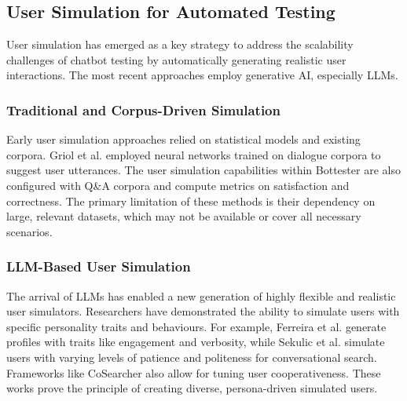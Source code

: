 \subsection{User Simulation for Automated Testing}

User simulation has emerged as a key strategy to
address the scalability challenges of chatbot testing
by automatically generating realistic user interactions.
The most recent approaches employ generative \acl{AI},
especially \acp {LLM}.

\subsubsection{Traditional and Corpus-Driven Simulation}

Early user simulation approaches
relied on statistical models and existing corpora.
Griol et al. \autocite{griolAutomaticDialogSimulation2013}
employed neural networks trained on dialogue corpora
to suggest user utterances.
The user simulation capabilities within Bottester
\autocite{vasconcelosBottesterTestingConversational2017}
are also configured with Q\&A corpora
and compute metrics on satisfaction and correctness.
The primary limitation of these methods is
their dependency on large, relevant datasets,
which may not be available or cover all necessary scenarios.

\subsubsection{LLM-Based User Simulation}

The arrival of \acp{LLM} has enabled a new generation
of highly flexible and realistic user simulators.
Researchers have demonstrated the ability
to simulate users with specific personality traits and behaviours.
For example, Ferreira et al. \autocite{ferreiraMultitraitUserSimulation2024}
generate profiles with traits like engagement and verbosity,
while Sekulic et al. \autocite{sekulicSimulatingConversationalSearch2024}
simulate users with varying levels of patience and politeness for conversational search.
Frameworks like CoSearcher \autocite{salleStudyingEffectivenessConversational2021}
also allow for tuning user cooperativeness.
These works prove the principle of creating diverse, persona-driven simulated users.

